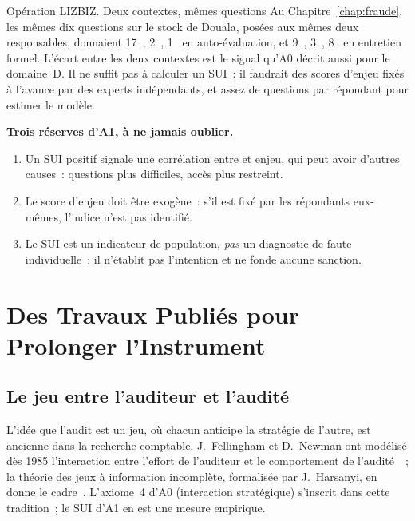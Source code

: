 \begin{boxscenario}{Opération LIZBIZ. Deux contextes, mêmes questions}
Au Chapitre~\ref{chap:fraude}, les mêmes dix questions sur le stock de
Douala, posées aux mêmes deux responsables, donnaient 17~\OUI{}, 2~\NON{},
1~\NEK{} en auto-évaluation, et 9~\OUI{}, 3~\NON{}, 8~\NEK{} en entretien
formel. L'écart entre les deux contextes est le signal qu'A0 décrit aussi
pour le domaine~D. Il ne suffit pas à calculer un SUI~: il faudrait des
scores d'enjeu fixés à l'avance par des experts indépendants, et assez de
questions par répondant pour estimer le modèle.
\end{boxscenario}

\begin{boxalert}
\textbf{Trois réserves d'A1, à ne jamais oublier.}
\begin{enumerate}
    \item Un SUI positif signale une corrélation entre \NEK{} et enjeu, qui
          peut avoir d'autres causes~: questions plus difficiles, accès plus
          restreint.
    \item Le score d'enjeu doit être exogène~: s'il est fixé par les
          répondants eux-mêmes, l'indice n'est pas identifié.
    \item Le SUI est un indicateur de population, \emph{pas} un diagnostic
          de faute individuelle~: il n'établit pas l'intention et ne fonde
          aucune sanction.
\end{enumerate}
\end{boxalert}

\section{Des Travaux Publiés pour Prolonger l'Instrument}
\label{sec:c31-travaux}

\subsection{Le jeu entre l'auditeur et l'audité}

L'idée que l'audit est un jeu, où chacun anticipe la stratégie de l'autre,
est ancienne dans la recherche comptable. J.~Fellingham et D.~Newman ont
modélisé dès 1985 l'interaction entre l'effort de l'auditeur et le
comportement de l'audité~\cite{fellingham1985strategic}~; la théorie des
jeux à information incomplète, formalisée par J.~Harsanyi, en donne le
cadre~\cite{harsanyi1967}. L'axiome~4 d'A0 (interaction stratégique)
s'inscrit dans cette tradition~; le SUI d'A1 en est une mesure empirique.

